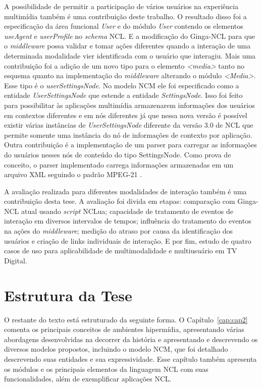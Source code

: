 A possibilidade de permitir a participação de vários usuários na experiência multimídia também é uma contribuição deste trabalho. O resultado disso foi a especificação da área funcional \textit{User} e do módulo \textit{User} contendo os elementos \textit{useAgent} e \textit{userProfile} no \textit{schema} NCL. E a modificação do Ginga-NCL para que o \textit{middleware} possa validar e tomar ações diferentes quando a interação de uma determinada modalidade vier identificada com o usuário que interagiu. Mais uma contribuição foi a adição de um novo tipo para o elemento \textit{<media>} tanto no esquema quanto na implementação do \textit{middleware} alterando o módulo \textit{<Media>}. Esse tipo é o \textit{userSettingsNode}. No modelo NCM ele foi especificado como a entidade \textit{UserSettingsNode} que estende a entidade \textit{SettingsNode}. Isso foi feito para possibilitar às aplicações multimídia armazenarem informações dos usuários em contextos diferentes e em nós diferentes já que nessa nova versão é possível existir várias instâncias de \textit{UserSettingsNode} diferente da versão 3.0 de NCL que permite somente uma instância do nó de informações de contexto por aplicação. Outra contribuição é a implementação de um parser para carregar as informações do usuários nesses nós de conteúdo do tipo SettingsNode. Como prova de conceito, o parser implementado carrega informações armazenadas em um arquivo XML seguindo o padrão MPEG-21 \cite{ISO/IEC:2019aa}. 

A avaliação realizada para diferentes modalidades de interação também é uma contribuição desta tese. A avaliação foi divida em etapas: comparação com Ginga-NCL atual usando \textit{script} NCLua; capacidade de tratamento de eventos de interação em diversos intervalos de tempos; influência do tratamento do eventos na ações do \textit{middleware}; medição do atraso por causa da identificação dos usuários e criação de links individuais de interação. E por fim, estudo de quatro casos de uso para aplicabilidade de multimodalidade e multiusuário em TV Digital. 


\section{Estrutura da Tese}
\label{sec:estrutura}

O restante do texto está estruturado da seguinte forma. O Capítulo~\ref{cap:cap2} comenta os principais conceitos de ambientes hipermídia, apresentando várias abordagens desenvolvidas na decorrer da história e apresentando e descrevendo os diversos modelos propostos, incluindo o modelo NCM, que foi detalhado descrevendo suas entidades e sua expressividade. Esse capítulo também apresenta os módulos e os principais elementos da linguagem NCL com suas funcionalidades, além de exemplificar aplicações NCL.

